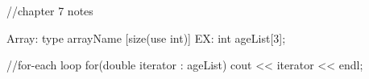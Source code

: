 //chapter 7 notes

Array:
type arrayName [size(use int)]
EX: int ageList[3];

//for-each loop
for(double iterator : ageList){
	cout << iterator << endl;
}
